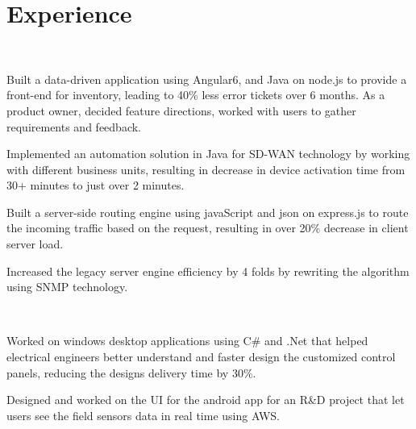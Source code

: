 \documentclass[]{rinkal_resume}
\begin{document}
\begin{minipage}[t]{0.69\textwidth} 


\section{Experience}

\hfill\   
\vspace{\topsep} %
\begin{tightemize}
\item Built a data-driven application using Angular6, and Java on node.js to provide a front-end for inventory, leading to 40\% less error tickets over 6 months. As a product owner, decided feature directions, worked with users to gather requirements and feedback.
\item Implemented an automation solution in Java for SD-WAN technology by working with different business units, resulting in decrease in device activation time from 30+ minutes to just over 2 minutes.
\item Built a server-side routing engine using javaScript and json on express.js to route the incoming traffic based on the request, resulting in over 20\% decrease in client server load.
\item Increased the legacy server engine efficiency by 4 folds by rewriting the algorithm using SNMP technology.
\end{tightemize}
\smallsectionsep

 \\
\begin{tightemize}
\item Worked on windows desktop applications using C\# and .Net that helped electrical engineers better understand and faster design the customized control panels, reducing the designs delivery time by 30\%.
\item Designed and worked on the UI for the android app for an R\&D project that let users see the field sensors data in real time using AWS.
\end{tightemize}
\smallsectionsep




\end{minipage}
\end{document}
